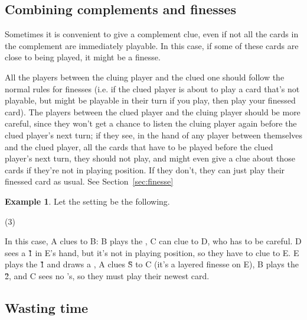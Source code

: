 \documentclass[a4paper]{article}
\theoremstyle{plain}
\theoremstyle{definition}
\newtheorem{example}[theorem]{Example}
\begin{document}
\subsection{Combining complements and finesses}

Sometimes it is convenient to give a complement clue, even if not all the cards in the complement are immediately playable. In this case, if some of these cards are close to being played, it might be a finesse.

All the players between the cluing player and the clued one should follow the normal rules for finesses (i.e. if the clued player is about to play a card that's not playable, but might be playable in their turn if you play, then play your finessed card). The players between the clued player and the cluing player should be more careful, since they won't get a chance to listen the cluing player again before the clued player's next turn; if they see, in the hand of any player between themselves and the clued player, all the cards that have to be played before the clued player's next turn, they should not play, and might even give a clue about those cards if they're not in playing position. If they don't, they can just play their finessed card as usual. See Section~\ref{sec:finesse}

\begin{example}
	
	Let the setting be the following.
	
	\begin{tasks}(3)
		\task[+]      
		\task[A]    
		\task[B]    
		\task[C]    
		\task[D]    
		\task[E]    
	\end{tasks}
	
	In this case, A clues  to B: B plays the , C can clue  to D, who has to be careful. D sees a \G{1} in E's hand, but it's not in playing position, so they have to clue  to E. E plays the \G{1} and draws a , A clues \G{S} to C (it's a layered finesse on E), B plays the \G{2}, and C sees no 's, so they must play their newest card.
\end{example}

\subsection{Wasting time}
\end{document}
